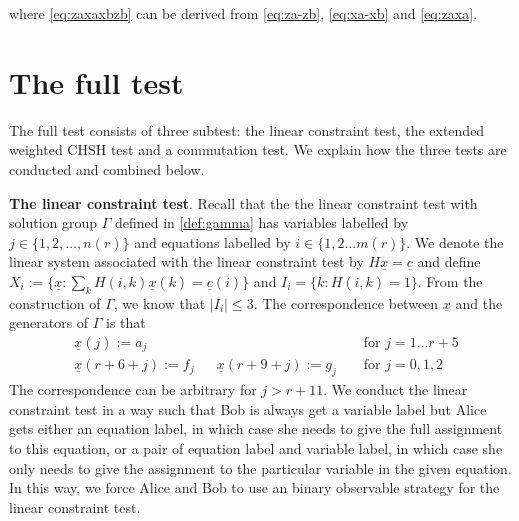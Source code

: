 \documentclass[11pt,letterpaper]{article}
\newcommand{\1}{\mathbb{1}}
\newcommand{\nr}{n(r)}
\newcommand{\mr}{m(r)}
\newcommand{\ux}{\underline{x}}
\newcommand{\uc}{\underline{c}}
\theoremstyle{definition}
\begin{document}
where \cref{eq:zaxaxbzb} can be derived from \cref{eq:za-zb}, \cref{eq:xa-xb} and \cref{eq:zaxa}.
\section{The full test}
\label{sec:full_test}
The full test consists of three subtest: the linear constraint test,
the extended weighted CHSH test and a commutation test. We explain how the three tests are conducted and
combined below.

\textbf{The linear constraint test}.
Recall that the the linear constraint test with solution group $\Gamma$ defined in \cref{def:gamma} has variables labelled by $j \in \{1,2,\dots,\nr\}$ and
equations labelled by $i \in \{1, 2 \dots \mr\}$.
We denote the linear system associated with the linear constraint test by $H\underline{x} = \uc$ and
define $X_i := \{ \ux : \sum_{k} H(i,k)\ux(k) = \uc(i) \}$ and $I_i = \{ k : H(i,k) = 1\}$.
From the construction of $\Gamma$, we know that $| I_i| \leq 3$.
The correspondence between $\ux$ and the generators of $\Gamma$ is that
\begin{align*}
	&\ux(j) := a_j &&&&\text{ for } j = 1 \dots r+5 \\
	&\ux(r+6+j) := f_j&& \ux(r+9+j) := g_j &&\text{ for } j = 0,1,2 
\end{align*} 
The correspondence can be arbitrary for $j > r+11$.
We conduct the linear constraint test in a way such that Bob is always get a variable label
but Alice gets either an equation label, in which case she needs to give the full assignment to this equation,
or a pair of equation label and variable label, in which case she only needs to give the assignment to the particular 
variable in the given equation. In this way, we force Alice and Bob to use an binary observable strategy for the linear constraint 
test. 
\end{document}

